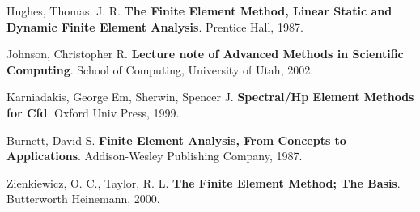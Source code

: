 \begin{thebibliography}{9}

Hughes, Thomas. J. R. \/
        {\bf The Finite Element Method, Linear Static and Dynamic Finite Element
        Analysis}.
        Prentice Hall, 1987.

Johnson, Christopher R. \/
        {\bf Lecture note of Advanced Methods in Scientific
        Computing}.
        School of Computing, University of Utah, 2002.

Karniadakis, George Em, Sherwin, Spencer J. \/
        {\bf Spectral/Hp Element Methods for Cfd}.
        Oxford Univ Press, 1999.

Burnett, David S. \/
        {\bf Finite Element Analysis, From Concepts to
        Applications}.
        Addison-Wesley Publishing Company, 1987.

Zienkiewicz, O. C., Taylor, R. L. \/
        {\bf The Finite Element Method; The Basis}.
        Butterworth Heinemann, 2000.

\end{thebibliography}
